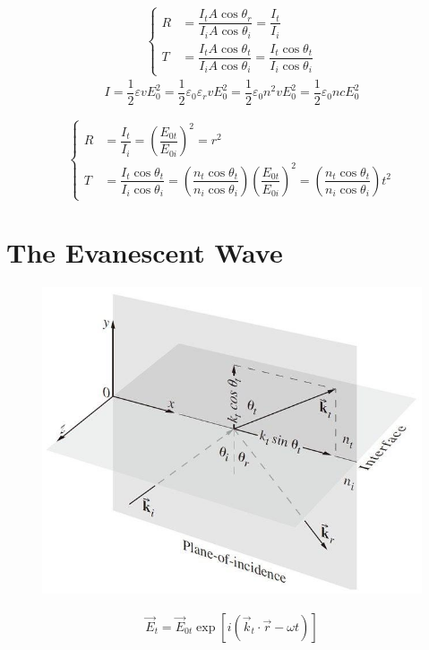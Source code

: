 \begin{equation*}
  \left\{
  \begin{aligned}
    R &= \dfrac{I_t A \cos \theta_r}{I_i A \cos \theta_i} = \dfrac{I_t}{I_i} \\
    T &= \dfrac{I_t A \cos \theta_t}{I_i A \cos \theta_i} = \dfrac{I_t \cos \theta_t}{I_i \cos \theta_i}
  \end{aligned}
  \right.
\end{equation*}
\begin{equation*}
  \begin{aligned}
    I = \dfrac{1}{2} \varepsilon v E_0^2 = \dfrac{1}{2} \varepsilon_0 \varepsilon_r v E_0^2 = \dfrac{1}{2} \varepsilon_0 n^2 v E_0^2 = \dfrac{1}{2} \varepsilon_0 n c E_0^2
  \end{aligned}
\end{equation*}

\begin{equation*}
  \left\{
  \begin{aligned}
    R &= \dfrac{I_t}{I_i} = \left( \dfrac{E_{0t}}{E_{0i}}  \right)^2 = r^2 \\
    T &= \dfrac{I_t \cos \theta_t}{I_i \cos \theta_i} = \left( \dfrac{n_t \cos \theta_t}{n_i \cos \theta_i}  \right) \left( \dfrac{E_{0t}}{E_{0i}}  \right)^2 = \left( \dfrac{n_t \cos \theta_t}{n_i \cos \theta_i}  \right) t^2
  \end{aligned}
  \right.
\end{equation*}

\section{The Evanescent Wave}

\begin{figure}[H]
  \centering
  \includegraphics[width=0.5\linewidth]{figures/Evanescent wave}
  \label{fig:}
\end{figure}

\begin{equation*}
  \begin{aligned}
    \vec{E}_t = \vec{E}_{0t} \exp \left[ i \left( \vec{k}_t  \cdot \vec{r} - \omega t \right) \right]
  \end{aligned}
\end{equation*}

